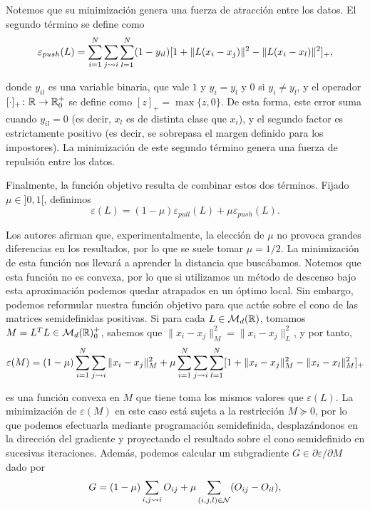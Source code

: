 Notemos que su minimización genera una fuerza de atracción entre los datos. El segundo término se define como
\[ \varepsilon_{push}(L) = \sum_{i=1}^{N}\sum_{j\rightsquigarrow i}\sum_{l=1}^{N} (1 - y_{il})[1 + \|L(x_i-x_j)\|^2 - \|L(x_i-x_l)\|^2]_{+}, \]

donde $y_{il}$ es una variable binaria, que vale $1$ y $y_i = y_l$ y $0$ si $y_i \ne y_l$, y el operador $[ \cdot ]_{+}\colon  \mathbb{R} \to \mathbb{R}^+_0$ se define como $[z]_{+} = \max\{z,0\}$. De esta forma, este error suma cuando $y_{il} = 0$ (es decir, $x_l$ es de distinta clase que $x_i$), y el segundo factor es estrictamente positivo (es decir, se sobrepasa el margen definido para los impostores). La minimización de este segundo término genera una fuerza de repulsión entre los datos.

Finalmente, la función objetivo resulta de combinar estos dos términos. Fijado $\mu \in ]0,1[$, definimos
\begin{equation} \label{eq:lmnn:L}
\varepsilon(L) = (1 - \mu)\varepsilon_{pull}(L) + \mu\varepsilon_{push}(L).
\end{equation}

Los autores afirman que, experimentalmente, la elección de $\mu$ no provoca grandes diferencias en los resultados, por lo que se suele tomar $\mu = 1/2$. La minimización de esta función nos llevará a aprender la distancia que buscábamos. Notemos que esta función no es convexa, por lo que si utilizamos un método de descenso bajo esta aproximación podemos quedar atrapados en un óptimo local. Sin embargo, podemos reformular nuestra función objetivo para que actúe sobre el cono de las matrices semidefinidas positivas. Si para cada $L \in \mathcal{M}_d(\mathbb{R})$, tomamos $M = L^TL \in \mathcal{M}_d(\mathbb{R})^+_0$, sabemos que $\|x_i-x_j\|_M^2 = \|x_i - x_j\|_L^2$, y por tanto,
\begin{equation} \label{eq:lmnn:M}
 \varepsilon(M) = (1-\mu) \sum_{i=1}^{N}\sum_{j\rightsquigarrow i} \|x_i - x_j\|_M^2 + \mu \sum_{i=1}^{N}\sum_{j\rightsquigarrow i}\sum_{l=1}^N [ 1 + \|x_i - x_j\|_M^2 - \|x_i - x_l\|_M^2]_{+}
\end{equation}

es una función convexa en $M$ que tiene toma los mismos valores que $\varepsilon(L)$. La minimización de $\varepsilon(M)$ en este caso está sujeta a la restricción $M \succeq 0$, por lo que podemos efectuarla mediante programación semidefinida, desplazándonos en la dirección del gradiente y proyectando el resultado sobre el cono semidefinido en sucesivas iteraciones. Además, podemos calcular un subgradiente $G \in \partial \varepsilon / \partial M$ dado por
\[ G = (1-\mu) \sum_{i,j\rightsquigarrow i} O_{ij} + \mu \sum_{(i,j,l) \in \mathcal{N}} (O_{ij} - O_{il}), \]

